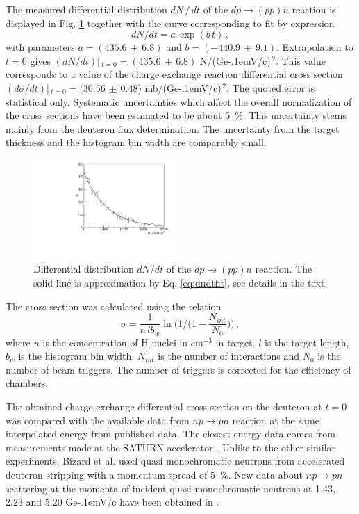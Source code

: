 \documentclass[twocolumn,epjc3]{svjour3}
\newcommand{\np}     {\ensuremath{np \rightarrow pn}\xspace}
\newcommand{\dpchex} {\ensuremath{dp \rightarrow (pp)n}\xspace}
\newcommand{\GeVc}   {Ge\kern-.1emV/c\xspace}
\begin{document}
The measured differential distribution $dN\,/\,dt$ of the \dpchex reaction is
displayed in Fig. \ref{fig:dndt} together with the curve corresponding to fit by
expression
\begin{equation}
  \label{eq:dndtfit}
  dN/dt = a\,\exp(b\,t)\,,
\end{equation}
with parameters $a=(435.6\,\pm\,6.8)$ and $b=(-440.9\,\pm\,9.1)$. Extrapolation
to $t=0$ gives $(dN/dt)|\,_{t=0}=(435.6\,\pm\,6.8)$ N$/$(\GeVc)$^{\,2}$. This
value corresponds to a value of the charge exchange reaction differential cross
section $(d\sigma/dt)|\,_{t=0}=(30.56\,\pm\,0.48$) mb$/$(\GeVc)$^{\,2}$. The
quoted error is statistical only. Systematic uncertainties which affect the
overall normalization of the cross sections have been estimated to be about
5~\%. This uncertainty stems mainly from the deuteron flux determination. The
uncertainty from the target thickness and the histogram bin width are comparably
small.

\begin{figure}[h]
  \centering
  \includegraphics[width=0.48\textwidth]{dp_dN.pdf}
  \caption{Differential distribution $dN/dt$ of the \dpchex reaction. The solid
    line is approximation by Eq. \eqref{eq:dndtfit}, see details in the text.}
  \label{fig:dndt}
\end{figure}

The cross section was calculated using the relation
\begin{equation}
  \sigma =
  \frac{1}{n\,lb_w}\ln\bigg(1\Big/\Big(1-\frac{N_{int}}{N_0}\Big)\bigg)\,,
\end{equation}
where $n$ is the concentration of H nuclei in cm$^{-3}$ in target, $l$ is the
target length, $b_w$ is the histogram bin width, $N_{int}$ is the number of
interactions and $N_0$ is the number of beam triggers. The number of triggers is
corrected for the efficiency of chambers.

The obtained charge exchange differential cross section on the deuteron at $t=0$
was compared with the available data from \np reaction at the same interpolated
energy from published data. The closest energy data comes from measurements made
at the SATURN accelerator \cite{biz75,bys78}. Unlike to the other similar
experiments, Bizard et al. \cite{biz75} used quasi monochromatic neutrons from
accelerated deuteron stripping with a momentum spread of 5~\%. New data about
\np scattering at the momenta of incident quasi monochromatic neutrons at 1.43,
2.23 and 5.20 \GeVc have been obtained in \cite{tro14}.
\end{document}
